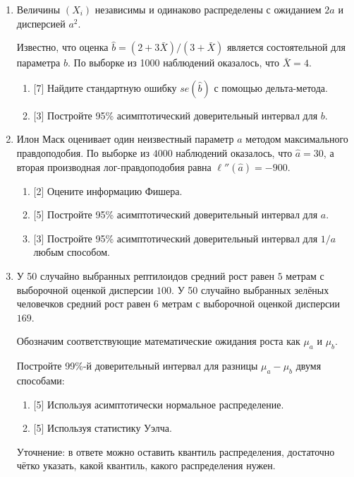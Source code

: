 \documentclass[12pt]{article}
\begin{document}
\begin{enumerate}
\item Величины $(X_i)$ независимы и одинаково распределены с ожиданием $2a$ и дисперсией $a^2$.

Известно, что оценка $\hat b = (2 + 3\bar X)/(3 + \bar X)$ является состоятельной для параметра $b$. 
По выборке из 1000 наблюдений оказалось, что $\bar X = 4$.

\begin{enumerate}
    \item {[7]} Найдите стандартную ошибку $se(\hat b)$ с помощью дельта-метода.
    \item {[3]} Постройте 95\% асимптотический доверительный интервал для $b$.
\end{enumerate}

\item Илон Маск оценивает один неизвестный параметр $a$ методом максимального правдоподобия.
По выборке из $4000$ наблюдений оказалось, что $\hat a = 30$, а вторая производная лог-правдоподобия равна $\ell''(\hat a) = -900$.
\begin{enumerate}
    \item {[2]} Оцените информацию Фишера. 
    \item {[5]} Постройте 95\% асимптотический доверительный интервал для $a$.
    \item {[3]} Постройте 95\% асимптотический доверительный интервал для $1/a$ любым способом.
\end{enumerate}

\item У 50 случайно выбранных рептилоидов средний рост равен $5$ метрам с выборочной оценкой дисперсии $100$.
У 50 случайно выбранных зелёных человечков средний рост равен $6$ метрам с выборочной оценкой дисперсии $169$.

Обозначим соответствующие математические ожидания роста как $\mu_a$ и $\mu_b$.

Постройте 99\%-й доверительный интервал для разницы $\mu_a - \mu_b$ двумя способами:
\begin{enumerate}
    \item {[5]} Используя асимптотически нормальное распределение.
    \item {[5]} Используя статистику Уэлча. 
\end{enumerate}

Уточнение: в ответе можно оставить квантиль распределения, достаточно чётко указать, какой квантиль, какого распределения нужен.

\end{enumerate}
\end{document}

